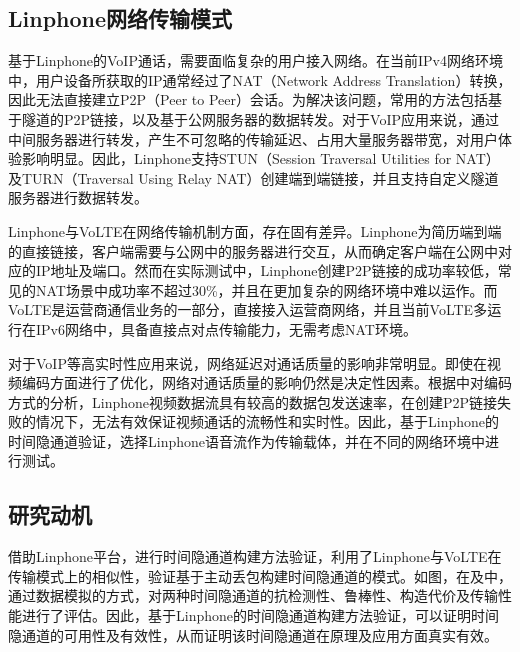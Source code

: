 \subsection{Linphone网络传输模式}
\label{chap:linphone:motivation:net}

基于Linphone的VoIP通话，需要面临复杂的用户接入网络。在当前IPv4网络环境中，用户设备所获取的IP通常经过了NAT（Network Address Translation）转换，因此无法直接建立P2P（Peer to Peer）会话。为解决该问题，常用的方法包括基于隧道的P2P链接，以及基于公网服务器的数据转发。对于VoIP应用来说，通过中间服务器进行转发，产生不可忽略的传输延迟、占用大量服务器带宽，对用户体验影响明显。因此，Linphone支持STUN（Session Traversal Utilities for NAT）及TURN（Traversal Using Relay NAT）创建端到端链接，并且支持自定义隧道服务器进行数据转发。

Linphone与VoLTE在网络传输机制方面，存在固有差异。Linphone为简历端到端的直接链接，客户端需要与公网中的服务器进行交互，从而确定客户端在公网中对应的IP地址及端口。然而在实际测试中，Linphone创建P2P链接的成功率较低，常见的NAT场景中成功率不超过30\%，并且在更加复杂的网络环境中难以运作。而VoLTE是运营商通信业务的一部分，直接接入运营商网络，并且当前VoLTE多运行在IPv6网络中，具备直接点对点传输能力，无需考虑NAT环境。

对于VoIP等高实时性应用来说，网络延迟对通话质量的影响非常明显。即使在视频编码方面进行了优化，网络对通话质量的影响仍然是决定性因素。根据中对编码方式的分析，Linphone视频数据流具有较高的数据包发送速率，在创建P2P链接失败的情况下，无法有效保证视频通话的流畅性和实时性。因此，基于Linphone的时间隐通道验证，选择Linphone语音流作为传输载体，并在不同的网络环境中进行测试。

\subsection{研究动机}
\label{chap:linphone:motivation:sum}


借助Linphone平台，进行时间隐通道构建方法验证，利用了Linphone与VoLTE在传输模式上的相似性，验证基于主动丢包构建时间隐通道的模式。如图，在及中，通过数据模拟的方式，对两种时间隐通道的抗检测性、鲁棒性、构造代价及传输性能进行了评估。因此，基于Linphone的时间隐通道构建方法验证，可以证明时间隐通道的可用性及有效性，从而证明该时间隐通道在原理及应用方面真实有效。